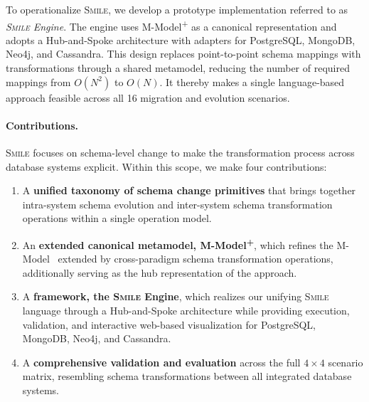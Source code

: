 \documentclass{llncs}
\begin{document}

To operationalize \textsc{Smile}, we develop a prototype implementation referred to as \emph{\textsc{Smile} Engine}. The engine uses M-Model\textsuperscript{+} as a canonical representation and adopts a Hub-and-Spoke architecture with adapters for PostgreSQL, MongoDB, Neo4j, and Cassandra. This design replaces point-to-point schema mappings with transformations through a shared metamodel, reducing the number of required mappings from $O(N^2)$ to $O(N)$. It thereby makes a single language-based approach feasible across all 16 migration and evolution scenarios.


\paragraph{Contributions.}
\textsc{Smile} focuses on schema-level change to make the transformation process across database systems explicit.
Within this scope, we make four contributions:
\begin{enumerate}
    \item A \textbf{unified taxonomy of schema change primitives} that brings together intra-system schema evolution and inter-system schema transformation operations within a single operation model.

    \item An \textbf{extended canonical metamodel, M-Model\textsuperscript{+}}, which refines the M-Model~\cite{conrad2022metamodels} extended by cross-paradigm schema transformation operations, additionally serving as the hub representation of the approach.

    \item A \textbf{framework, the \textsc{Smile} Engine}, which realizes our unifying \textsc{Smile} language through a Hub-and-Spoke architecture while providing execution, validation, and interactive web-based visualization for PostgreSQL, MongoDB, Neo4j, and Cassandra.

    \item A \textbf{comprehensive validation and evaluation} across the full $4 \times 4$ scenario matrix, resembling schema transformations between all integrated database systems.
\end{enumerate}
\end{document}
